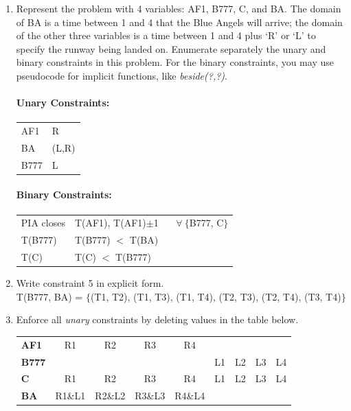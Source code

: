 \documentclass[12pt]{article}
\begin{document}
\begin{enumerate}

\item Represent the problem with 4 variables: AF1, B777, C, and
  BA. The domain of BA is a time between 1 and 4 that the Blue Angels
  will arrive; the domain of the other three variables is a time
  between 1 and 4 plus `R' or `L' to specify the runway being landed
  on.  Enumerate separately the unary and binary constraints in this
  problem. For the binary constraints, you may use pseudocode for
  implicit functions, like {\it beside(?,?)}.

  \paragraph{Unary Constraints:}

  \begin{flushleft}\begin{tabular}{ll}
  AF1  & R \\
  BA  & (L,R) \\
  B777 & L\\
  \end{tabular}\end{flushleft}

  \paragraph{Binary Constraints:}

  \begin{flushleft}\begin{tabular}{ll}
  PIA closes  & T(AF1), T(AF1)$\pm$1 \ \ \ $\forall\ \{$B777, C$\}$ \\
  T(B777)  & T(B777) $<$ T(BA) \\
  T(C)  & T(C) $<$ T(B777) \\
  \end{tabular}\end{flushleft}

\item Write constraint 5 in explicit form. \\

T(B777, BA) = $\{$(T1, T2), (T1, T3), (T1, T4), (T2, T3), (T2, T4), (T3, T4)$\}$

\item Enforce all {\it unary} constraints by deleting values in the table below.

\begin{center}\begin{tabular}{l|cccccccc|}
{\bf AF1}  & R1 & R2 & R3 & R4 & & & & \\ 
{\bf B777} &  &  &  &  & L1 & L2 & L3 & L4 \\ 
{\bf C}    & R1 & R2 & R3 & R4 & L1 & L2 & L3 & L4 \\ 
{\bf BA}   & R1\&L1 & R2\&L2 & R3\&L3 & R4\&L4 &  &  &  &  \\ 
\end{tabular}\end{center}


\end{enumerate}
\end{document}
